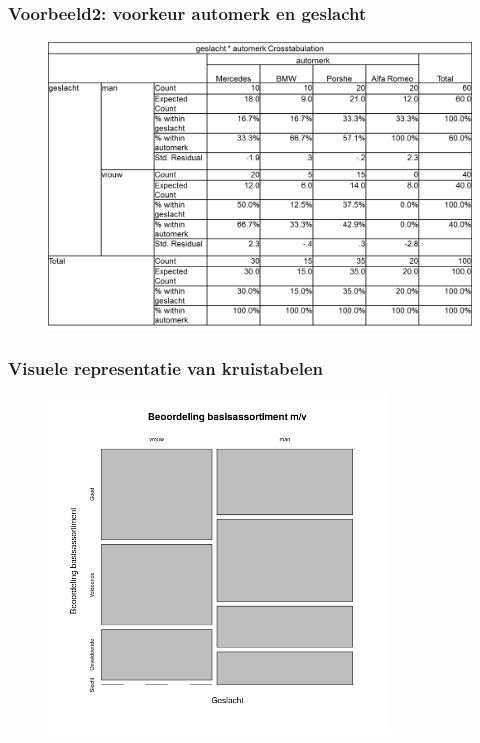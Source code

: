 \documentclass{beamer}
\begin{document}
\begin{frame}
  \frametitle{Voorbeeld2: voorkeur automerk en geslacht}

  \begin{figure}
    \centering
    \includegraphics[width=1.00\textwidth]{img/les3-spssCars.png}
    \label{fig:les3-spssCars}
  \end{figure}

\end{frame}

\begin{frame}
  \frametitle{Visuele representatie van kruistabelen}
  
  \begin{figure}
    \centering
    \includegraphics[width=0.80\textwidth]{img/2var-xtab-plot-waardering}
  \end{figure}
  
\end{frame}
\end{document}

